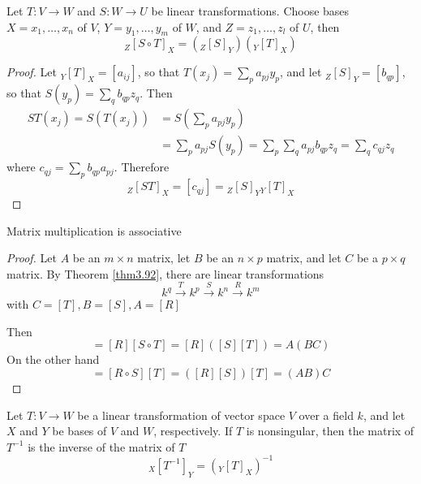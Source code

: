 \documentclass[11pt]{article}
\begin{document}
\begin{proposition}[]
\label{prop3.98}
Let \(T:V\to W\) and \(S:W\to U\) be linear transformations. Choose bases 
\(X=x_1,\dots,x_n\) of \(V\), \(Y=y_1,\dots,y_m\) of \(W\), and
\(Z=z_1,\dots,z_l\) of \(U\), then
\begin{equation*}
{}_Z[S\circ T]_X=({}_Z[S]_Y)({}_Y[T]_X)
\end{equation*}
\end{proposition}

\begin{proof}
Let \({}_Y[T]_X=[a_{ij}]\), so that \(T(x_j)=\sum_pa_{pj}y_p\), and let
\({}_Z[S]_Y=[b_{qp}]\), so that \(S(y_p)=\sum_qb_{qp}z_q\). Then
\begin{align*}
ST(x_j)=S(T(x_j))&=S(\displaystyle\sum_{p}a_{pj}y_p)\\
&=\displaystyle\sum_{p}a_{pj}S(y_p)=\displaystyle\sum_{p}
\displaystyle\sum_qa_{pj}b_{qp}z_q=\displaystyle\sum_{q}c_{qj}z_q
\end{align*}
where \(c_{qj}=\sum_{p}b_{qp}a_{pj}\). Therefore
\begin{equation*}
{}_Z[ST]_X=[c_{qj}]={}_Z[S]_Y{}_Y[T]_X
\end{equation*}
\end{proof}

\begin{corollary}[]
Matrix multiplication is associative
\end{corollary}

\begin{proof}
Let \(A\) be an \(m\times n\) matrix, let \(B\) be an \(n\times p\) matrix,
and let \(C\) be a \(p\times q\) matrix. By Theorem \ref{thm3.92}, there are
linear transformations
\begin{equation*}
k^q\xrightarrow{T}k^p\xrightarrow{S}k^n\xrightarrow{R}k^m
\end{equation*}
with \(C=[T],B=[S],A=[R]\)

Then 
\begin{equation*}
[R\circ(S\circ T)]=[R][S\circ T]=[R]([S][T])=A(BC)
\end{equation*}
On the other hand
\begin{equation*}
[(R\circ S)\circ T]=[R\circ S][T]=([R][S])[T]=(AB)C
\end{equation*}
\end{proof}

\begin{corollary}[]
\label{cor3.100}
Let \(T:V\to W\) be a linear transformation of vector space \(V\) over a
field \(k\), and let \(X\) and \(Y\) be bases of \(V\) and \(W\),
respectively. If \(T\) is nonsingular, then the matrix of \(T^{-1}\) is the
inverse of the matrix of \(T\)
\begin{equation*}
{}_X[T^{-1}]_Y=({}_Y[T]_X)^{-1}
\end{equation*}
\end{corollary}
\end{document}
